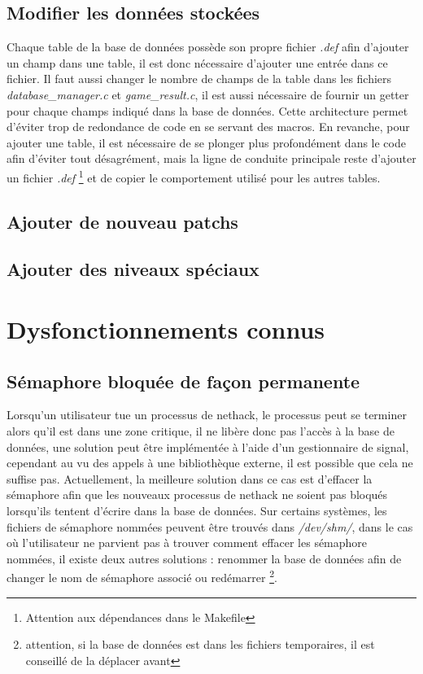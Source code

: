\documentclass[10pt,a4paper]{report}
\begin{document}
\section{Modifier les données stockées}
Chaque table de la base de données possède son propre fichier \emph{.def} afin
d'ajouter un champ dans une table, il est donc nécessaire d'ajouter une entrée
dans ce fichier. Il faut aussi changer le nombre de champs de la table dans les
fichiers \emph{database\_manager.c} et \emph{game\_result.c}, il est aussi
nécessaire de fournir un getter pour chaque champs indiqué dans la base de
données. Cette architecture permet d'éviter trop de redondance de code en se
servant des macros. En revanche, pour ajouter une table, il est nécessaire de se
plonger plus profondément dans le code afin d'éviter tout désagrément, mais la
ligne de conduite principale reste d'ajouter un fichier \emph{.def}
\footnote{Attention aux dépendances dans le Makefile} et de copier le
comportement utilisé pour les autres tables.

\section{Ajouter de nouveau patchs}

\section{Ajouter des niveaux spéciaux}

\chapter{Dysfonctionnements connus}
\section{Sémaphore bloquée de façon permanente}
Lorsqu'un utilisateur tue un processus de nethack, le processus peut se terminer
alors qu'il est dans une zone critique, il ne libère donc pas l'accès à la base
de données, une solution peut être implémentée à l'aide d'un gestionnaire de
signal, cependant au vu des appels à une bibliothèque externe, il est possible
que cela ne suffise pas. Actuellement, la meilleure solution dans ce cas est
d'effacer la sémaphore afin que les nouveaux processus de nethack ne soient pas
bloqués lorsqu'ils tentent d'écrire dans la base de données. Sur certains
systèmes, les fichiers de sémaphore nommées peuvent être trouvés dans 
\emph{/dev/shm/}, dans le cas où l'utilisateur ne parvient pas à trouver
comment effacer les sémaphore nommées, il existe deux autres solutions :
renommer la base de données afin de changer le nom de sémaphore associé ou
redémarrer \footnote{attention, si la base de données est dans les fichiers
temporaires, il est 
conseillé de la déplacer avant}.
\end{document}
